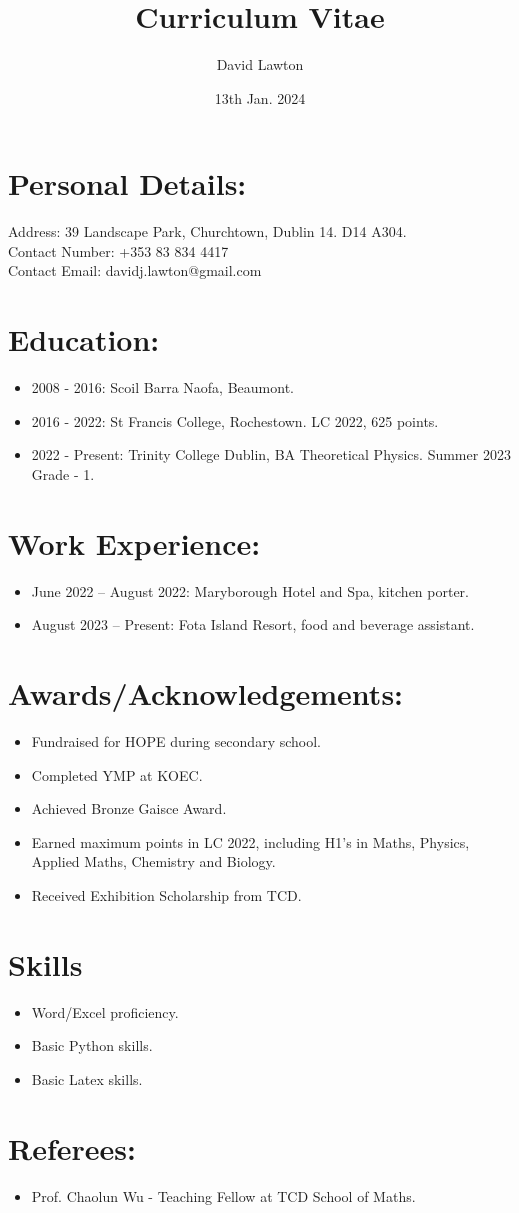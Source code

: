 \documentclass{article}
\title{Curriculum Vitae}
\author{David Lawton}
\date{13th Jan. 2024}
\begin{document}
\maketitle
\vfill
\newpage
\section{Personal Details:}
Address: 39 Landscape Park, Churchtown, Dublin 14. D14 A304.\\
Contact Number: +353 83 834 4417\\
Contact Email: davidj.lawton@gmail.com\\

\section{Education:}
\begin{itemize}
\item 2008 - 2016: Scoil Barra Naofa, Beaumont.
\item 2016 - 2022: St Francis College, Rochestown. LC 2022, 625 points.
\item 2022 - Present: Trinity College Dublin, BA Theoretical Physics. Summer 2023 Grade - 1.
\end{itemize}
\section{Work Experience:}
\begin{itemize}
\item June 2022 – August 2022: Maryborough Hotel and Spa, kitchen porter. 
\item August 2023 – Present: Fota Island Resort, food and beverage assistant.
\end{itemize}
\section{Awards/Acknowledgements:}
\begin{itemize}
\item Fundraised for HOPE during secondary school.
\item Completed YMP at KOEC.
\item Achieved Bronze Gaisce Award.
\item Earned maximum points in LC 2022, including H1's in Maths, Physics, Applied Maths, Chemistry and Biology.
\item Received Exhibition Scholarship from TCD.
\end{itemize}
\section{Skills}
\begin{itemize}
\item Word/Excel proficiency.
\item Basic Python skills.
\item Basic Latex skills.
\end{itemize}
\section{Referees:}
\begin{itemize}
\item Prof. Chaolun Wu - Teaching Fellow at TCD School of Maths.
\end{itemize}
\end{document}
